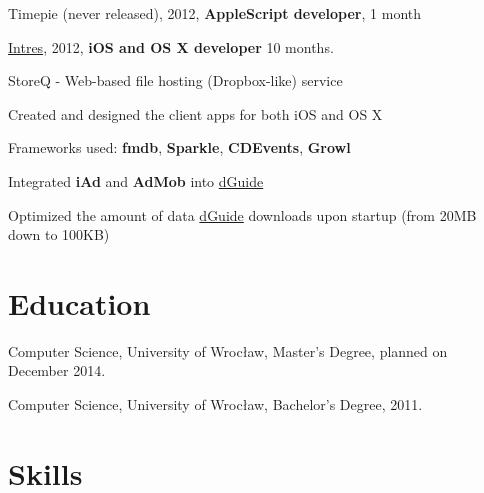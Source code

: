 \documentclass[letterpaper]{article}
\renewenvironment{itemize}{
  \begin{list}{}{
    \setlength{\leftmargin}{1.5em}
  }
}{
  \end{list}
}
\begin{document}
\begin{itemize}
	\item Timepie (never released), 2012, {\bf AppleScript developer}, 1 month

    \item \href{http://intres.com.pl}{Intres}, 2012, {\bf iOS and OS X developer} 10 months.
		\begin{itemize}

            \item StoreQ - Web-based file hosting (Dropbox-like) service
                \begin{itemize}
                    \item Created and designed the client apps for both iOS and OS X
                    \item Frameworks used: {\bf fmdb}, {\bf Sparkle}, {\bf CDEvents}, {\bf Growl}
                \end{itemize}

            \item Integrated {\bf iAd} and {\bf AdMob} into \href{http://dguide.pl}{dGuide}

            \item Optimized the amount of data \href{http://dguide.pl}{dGuide} downloads upon startup (from 20MB down to 100KB)

        \end{itemize}

\end{itemize}

\section*{Education}

\begin{itemize}
  	\item Computer Science, University of Wrocław, Master's Degree, planned on December 2014.
  	\item Computer Science, University of Wrocław, Bachelor's Degree, 2011.
\end{itemize}

\section*{Skills}
\end{document}
